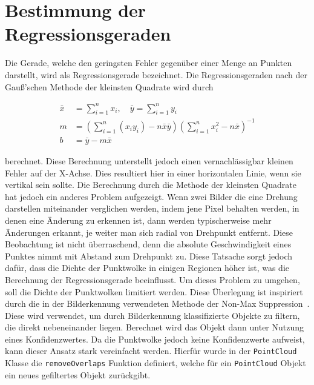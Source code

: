 \section{Bestimmung der Regressionsgeraden}\label{ch:bestimmung_regressionsgerade}

Die Gerade, welche den geringsten Fehler gegenüber einer Menge an Punkten darstellt, wird als Regressionsgerade bezeichnet.
Die Regressionsgeraden nach der Gau{\ss}'schen Methode der kleinsten Quadrate wird durch~\cite[S.~694]{Papula2016}

\begin{equation}
    \begin{split}
        \bar{x} &= \sum_{i=1}^n x_i, \quad \bar{y} = \sum_{i=1}^n y_i \\
        m &= \left(\sum_{i=1}^n (x_i y_i) - n \bar{x} \bar{y}\right) \left(\sum_{i=1}^n x_i^2 - n \bar{x}\right)^{-1} \\
        b &= \bar{y} - m\bar{x}
    \end{split}
    \label{eq:regression_gauss}
\end{equation}

berechnet.
Diese Berechnung unterstellt jedoch einen vernachlässigbar kleinen Fehler auf der X-Achse.
Dies resultiert hier in einer horizontalen Linie, wenn sie vertikal sein sollte.
Die Berechnung durch die Methode der kleinsten Quadrate hat jedoch ein anderes Problem aufgezeigt.
Wenn zwei Bilder die eine Drehung darstellen miteinander verglichen werden, indem jene Pixel behalten werden, in denen eine Änderung zu erkennen ist, dann werden typischerweise mehr Änderungen erkannt, je weiter man sich radial von Drehpunkt entfernt.
Diese Beobachtung ist nicht überraschend, denn die absolute Geschwindigkeit eines Punktes nimmt mit Abstand zum Drehpunkt zu.
Diese Tatsache sorgt jedoch dafür, dass die Dichte der Punktwolke in einigen Regionen höher ist, was die Berechnung der Regressionsgerade beeinflusst.
Um dieses Problem zu umgehen, soll die Dichte der Punktwolken limitiert werden.
Diese Überlegung ist inspiriert durch die in der Bilderkennung verwendeten Methode der Non-Max Suppression~\cite[S.~486]{Geron2019}.
Diese wird verwendet, um durch Bilderkennung klassifizierte Objekte zu filtern, die direkt nebeneinander liegen.
Berechnet wird das Objekt dann unter Nutzung eines Konfidenzwertes.
Da die Punktwolke jedoch keine Konfidenzwerte aufweist, kann dieser Ansatz stark vereinfacht werden.
Hierfür wurde in der \lstinline{PointCloud} Klasse die \lstinline{removeOverlaps} Funktion definiert, welche für ein \lstinline{PointCloud} Objekt ein neues gefiltertes Objekt zurückgibt.

